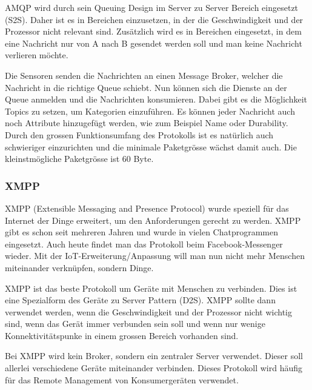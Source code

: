 AMQP wird durch sein Queuing Design im Server zu Server Bereich eingesetzt (S2S).\cite{ProtPubSub} Daher ist es in Bereichen einzusetzen, in der die Geschwindigkeit und der Prozessor nicht relevant sind. Zusätzlich wird es in Bereichen eingesetzt, in dem eine Nachricht nur von A nach B gesendet werden soll und man keine Nachricht verlieren möchte.

Die Sensoren senden die Nachrichten an einen Message Broker, welcher die Nachricht in die richtige Queue schiebt. Nun können sich die Dienste an der Queue anmelden und die Nachrichten konsumieren. Dabei gibt es die Möglichkeit Topics zu setzen, um Kategorien einzuführen. Es können jeder Nachricht auch noch Attribute hinzugefügt werden, wie zum Beispiel Name oder Durability. Durch den grossen Funktionsumfang des Protokolls ist es natürlich auch schwieriger einzurichten und die minimale Paketgrösse wächst damit auch. Die kleinstmögliche Paketgrösse ist 60 Byte.
\subsubsection{XMPP}
XMPP (Extensible Messaging and Presence Protocol) wurde speziell für das Internet der Dinge erweitert, um den Anforderungen gerecht zu werden. XMPP gibt es schon seit mehreren Jahren und wurde in vielen Chatprogrammen eingesetzt. Auch heute findet man das Protokoll beim Facebook-Messenger wieder. Mit der IoT-Erweiterung/Anpassung will man nun nicht mehr Menschen miteinander verknüpfen, sondern Dinge. 

XMPP ist das beste Protokoll um Geräte mit Menschen zu verbinden. Dies ist eine Spezialform des Geräte zu Server Pattern (D2S). \cite{ProtPubSub} XMPP sollte dann verwendet werden, wenn die Geschwindigkeit und der Prozessor nicht wichtig sind, wenn das Gerät immer verbunden sein soll und wenn nur wenige Konnektivitätspunke in einem grossen Bereich vorhanden sind.\cite{ProtPubSubReason}

Bei XMPP wird kein Broker, sondern ein zentraler Server verwendet. Dieser soll allerlei verschiedene Geräte miteinander verbinden. Dieses Protokoll wird häufig für das Remote Management von Konsumergeräten verwendet.
